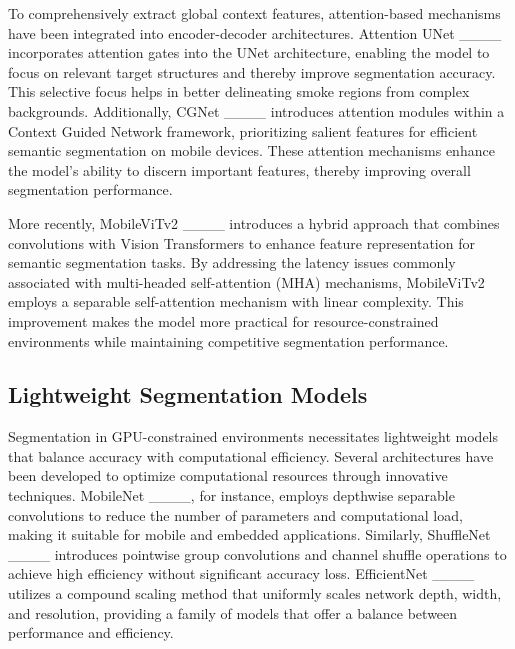 To comprehensively extract global context features, attention-based mechanisms have been integrated into encoder-decoder architectures. Attention UNet ____ incorporates attention gates into the UNet architecture, enabling the model to focus on relevant target structures and thereby improve segmentation accuracy. This selective focus helps in better delineating smoke regions from complex backgrounds. Additionally, CGNet ____ introduces attention modules within a Context Guided Network framework, prioritizing salient features for efficient semantic segmentation on mobile devices. These attention mechanisms enhance the model's ability to discern important features, thereby improving overall segmentation performance.

More recently, MobileViTv2 ____ introduces a hybrid approach that combines convolutions with Vision Transformers to enhance feature representation for semantic segmentation tasks. By addressing the latency issues commonly associated with multi-headed self-attention (MHA) mechanisms, MobileViTv2 employs a separable self-attention mechanism with linear complexity. This improvement makes the model more practical for resource-constrained environments while maintaining competitive segmentation performance.



\subsection{Lightweight Segmentation Models}

Segmentation in GPU-constrained environments necessitates lightweight models that balance accuracy with computational efficiency. Several architectures have been developed to optimize computational resources through innovative techniques. MobileNet ____, for instance, employs depthwise separable convolutions to reduce the number of parameters and computational load, making it suitable for mobile and embedded applications. Similarly, ShuffleNet ____ introduces pointwise group convolutions and channel shuffle operations to achieve high efficiency without significant accuracy loss. EfficientNet ____ utilizes a compound scaling method that uniformly scales network depth, width, and resolution, providing a family of models that offer a balance between performance and efficiency.

